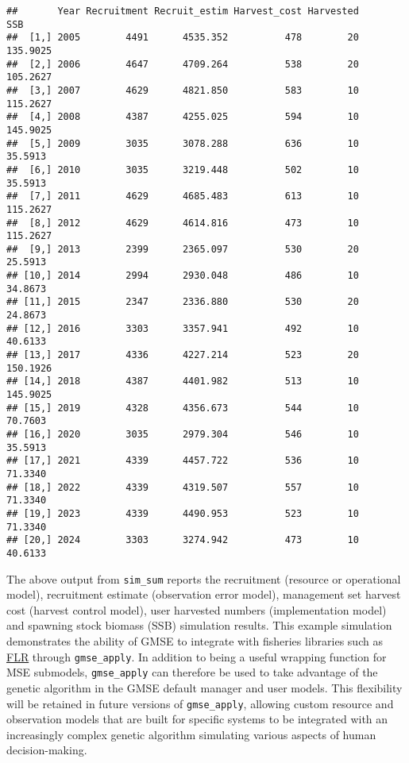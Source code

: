\documentclass[]{article}
\begin{document}
\begin{verbatim}
##       Year Recruitment Recruit_estim Harvest_cost Harvested      SSB
##  [1,] 2005        4491      4535.352          478        20 135.9025
##  [2,] 2006        4647      4709.264          538        20 105.2627
##  [3,] 2007        4629      4821.850          583        10 115.2627
##  [4,] 2008        4387      4255.025          594        10 145.9025
##  [5,] 2009        3035      3078.288          636        10  35.5913
##  [6,] 2010        3035      3219.448          502        10  35.5913
##  [7,] 2011        4629      4685.483          613        10 115.2627
##  [8,] 2012        4629      4614.816          473        10 115.2627
##  [9,] 2013        2399      2365.097          530        20  25.5913
## [10,] 2014        2994      2930.048          486        10  34.8673
## [11,] 2015        2347      2336.880          530        20  24.8673
## [12,] 2016        3303      3357.941          492        10  40.6133
## [13,] 2017        4336      4227.214          523        20 150.1926
## [14,] 2018        4387      4401.982          513        10 145.9025
## [15,] 2019        4328      4356.673          544        10  70.7603
## [16,] 2020        3035      2979.304          546        10  35.5913
## [17,] 2021        4339      4457.722          536        10  71.3340
## [18,] 2022        4339      4319.507          557        10  71.3340
## [19,] 2023        4339      4490.953          523        10  71.3340
## [20,] 2024        3303      3274.942          473        10  40.6133
\end{verbatim}

The above output from \texttt{sim\_sum} reports the recruitment
(resource or operational model), recruitment estimate (observation error
model), management set harvest cost (harvest control model), user
harvested numbers (implementation model) and spawning stock biomass
(SSB) simulation results. This example simulation demonstrates the
ability of GMSE to integrate with fisheries libraries such as
\href{http://www.flr-project.org/}{FLR} through \texttt{gmse\_apply}. In
addition to being a useful wrapping function for MSE submodels,
\texttt{gmse\_apply} can therefore be used to take advantage of the
genetic algorithm in the GMSE default manager and user models. This
flexibility will be retained in future versions of \texttt{gmse\_apply},
allowing custom resource and observation models that are built for
specific systems to be integrated with an increasingly complex genetic
algorithm simulating various aspects of human decision-making.
\end{document}

